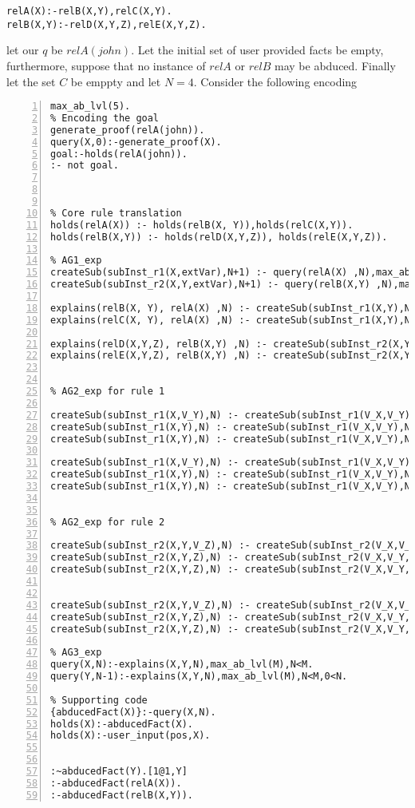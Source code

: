 \begin{verbatim}
relA(X):-relB(X,Y),relC(X,Y).
relB(X,Y):-relD(X,Y,Z),relE(X,Y,Z).
\end{verbatim}

let our $q$ be $relA(john)$. Let the initial set of user provided facts be empty, furthermore, suppose that no instance of $relA$ or $relB$ may be abduced. Finally let the set $C$ be emppty and let $N=4$.  
Consider the following encoding
\begin{lstlisting}[numbers=left]
max_ab_lvl(5).
% Encoding the goal
generate_proof(relA(john)).
query(X,0):-generate_proof(X).
goal:-holds(relA(john)).
:- not goal.



% Core rule translation
holds(relA(X)) :- holds(relB(X, Y)),holds(relC(X,Y)).
holds(relB(X,Y)) :- holds(relD(X,Y,Z)), holds(relE(X,Y,Z)).

% AG1_exp
createSub(subInst_r1(X,extVar),N+1) :- query(relA(X) ,N),max_ab_lvl(M),N<M-1.
createSub(subInst_r2(X,Y,extVar),N+1) :- query(relB(X,Y) ,N),max_ab_lvl(M),N<M-1.

explains(relB(X, Y), relA(X) ,N) :- createSub(subInst_r1(X,Y),N).
explains(relC(X, Y), relA(X) ,N) :- createSub(subInst_r1(X,Y),N).

explains(relD(X,Y,Z), relB(X,Y) ,N) :- createSub(subInst_r2(X,Y,Z),N).
explains(relE(X,Y,Z), relB(X,Y) ,N) :- createSub(subInst_r2(X,Y,Z),N).


% AG2_exp for rule 1

createSub(subInst_r1(X,V_Y),N) :- createSub(subInst_r1(V_X,V_Y),N), holds(relA(X)).
createSub(subInst_r1(X,Y),N) :- createSub(subInst_r1(V_X,V_Y),N), holds(relB(X,Y)).
createSub(subInst_r1(X,Y),N) :- createSub(subInst_r1(V_X,V_Y),N), holds(relC(X,Y)).

createSub(subInst_r1(X,V_Y),N) :- createSub(subInst_r1(V_X,V_Y),N), query(relA(X),L).
createSub(subInst_r1(X,Y),N) :- createSub(subInst_r1(V_X,V_Y),N), query(relB(X,Y),L).
createSub(subInst_r1(X,Y),N) :- createSub(subInst_r1(V_X,V_Y),N), query(relC(X,Y),L).


% AG2_exp for rule 2

createSub(subInst_r2(X,Y,V_Z),N) :- createSub(subInst_r2(V_X,V_Y,V_Z),N), holds(relB(X,Y)).
createSub(subInst_r2(X,Y,Z),N) :- createSub(subInst_r2(V_X,V_Y,V_Z),N), holds(relD(X,Y,Z)).
createSub(subInst_r2(X,Y,Z),N) :- createSub(subInst_r2(V_X,V_Y,V_Z),N), holds(relE(X,Y,Z)).


createSub(subInst_r2(X,Y,V_Z),N) :- createSub(subInst_r2(V_X,V_Y,V_Z),N), query(relB(X,Y),L).
createSub(subInst_r2(X,Y,Z),N) :- createSub(subInst_r2(V_X,V_Y,V_Z),N), query(relD(X,Y,Z),L).
createSub(subInst_r2(X,Y,Z),N) :- createSub(subInst_r2(V_X,V_Y,V_Z),N), query(relE(X,Y,Z),L).

% AG3_exp
query(X,N):-explains(X,Y,N),max_ab_lvl(M),N<M.
query(Y,N-1):-explains(X,Y,N),max_ab_lvl(M),N<M,0<N.

% Supporting code
{abducedFact(X)}:-query(X,N).
holds(X):-abducedFact(X).
holds(X):-user_input(pos,X).


:~abducedFact(Y).[1@1,Y]
:-abducedFact(relA(X)).
:-abducedFact(relB(X,Y)).

\end{lstlisting}


